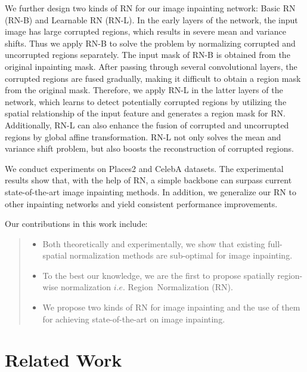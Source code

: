 \documentclass[letterpaper]{article} %
\begin{document}
We further design two kinds of RN for our image inpainting network: Basic RN (RN-B) and Learnable RN (RN-L). In the early layers of the network, the input image has large corrupted regions, which results in severe mean and variance shifts. Thus we apply RN-B to solve the problem by normalizing corrupted and uncorrupted regions separately. The input mask of RN-B is obtained from the original inpainting mask. After passing through several convolutional layers, the corrupted regions are fused gradually, making it difficult to obtain a region mask from the original mask. Therefore, we apply RN-L in the latter layers of the network, which learns to detect potentially corrupted regions by utilizing the spatial relationship of the input feature and generates a region mask for RN. Additionally, RN-L can also enhance the fusion of corrupted and uncorrupted regions by global affine transformation. RN-L not only solves the mean and variance shift problem, but also boosts the reconstruction of corrupted regions. 

We conduct experiments on Places2 \cite{zhou2017places} and CelebA \cite{liu2015deep} datasets. The experimental results show that, with the help of RN, a simple backbone can surpass current state-of-the-art image inpainting methods. In addition, we generalize our RN to other inpainting networks and yield consistent performance improvements.

Our contributions in this work include:
\begin{quote}
	\begin{itemize}
		\item Both theoretically and experimentally, we show that existing full-spatial normalization methods are sub-optimal for image inpainting.
		\item To the best our knowledge, we are the first to \mbox{propose} spatially region-wise normalization $i.e.$ \mbox{Region Normalization} (RN).
		\item We propose two kinds of RN for image inpainting and the use of them for achieving state-of-the-art on image inpainting. 
	\end{itemize}
\end{quote}



\section{Related Work}
\end{document}
